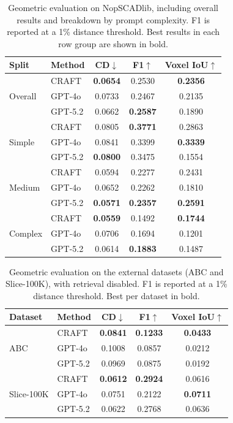 \documentclass[conference]{IEEEtran}
\begin{document}
\begin{table}[t!]
    \centering
    \caption{Geometric evaluation on NopSCADlib, including overall results and breakdown by prompt complexity. F1 is reported at a 1\% distance threshold. Best results in each row group are shown in bold.}
    \label{tab:nopscad-results}
    \small
    \setlength{\tabcolsep}{6pt}
    \begin{tabular}{llccc}
    \toprule
    Split & Method & CD$\downarrow$ & F1$\uparrow$ & Voxel IoU$\uparrow$ \\
    \midrule
    \multirow{3}{*}{Overall}
    & CRAFT   & \textbf{0.0654} & 0.2530 & \textbf{0.2356} \\
    & GPT-4o  & 0.0733 & 0.2467 & 0.2135 \\
    & GPT-5.2 & 0.0662 & \textbf{0.2587} & 0.1890 \\
    \midrule
    \multirow{3}{*}{Simple}
    & CRAFT   & 0.0805 & \textbf{0.3771} & 0.2863 \\
    & GPT-4o  & 0.0841 & 0.3399 & \textbf{0.3339} \\
    & GPT-5.2 & \textbf{0.0800} & 0.3475 & 0.1554 \\
    \midrule
    \multirow{3}{*}{Medium}
    & CRAFT   & 0.0594 & 0.2277 & 0.2431 \\
    & GPT-4o  & 0.0652 & 0.2262 & 0.1810 \\
    & GPT-5.2 & \textbf{0.0571} & \textbf{0.2357} & \textbf{0.2591} \\
    \midrule
    \multirow{3}{*}{Complex}
    & CRAFT   & \textbf{0.0559} & 0.1492 & \textbf{0.1744} \\
    & GPT-4o  & 0.0706 & 0.1694 & 0.1201 \\
    & GPT-5.2 & 0.0614 & \textbf{0.1883} & 0.1487 \\
    \bottomrule
    \end{tabular}
\end{table}

\begin{table}[t!]
\centering
\caption{Geometric evaluation on the external datasets (ABC and Slice-100K), with retrieval disabled. F1 is reported at a 1\% distance threshold. Best per dataset in bold.}
\label{tab:external-results}
\small
\setlength{\tabcolsep}{6pt}
\begin{tabular}{llccc}
\toprule
Dataset & Method & CD$\downarrow$ & F1$\uparrow$ & Voxel IoU$\uparrow$ \\
\midrule
\multirow{3}{*}{ABC}
& CRAFT   & \textbf{0.0841} & \textbf{0.1233} & \textbf{0.0433} \\
& GPT-4o  & 0.1008 & 0.0857 & 0.0212 \\
& GPT-5.2 & 0.0969 & 0.0875 & 0.0192 \\
\midrule
\multirow{3}{*}{Slice-100K}
& CRAFT   & \textbf{0.0612} & \textbf{0.2924} & 0.0616 \\
& GPT-4o  & 0.0751 & 0.2122 & \textbf{0.0711} \\
& GPT-5.2 & 0.0622 & 0.2768 & 0.0636 \\
\bottomrule
\end{tabular}
\end{table}
\end{document}
